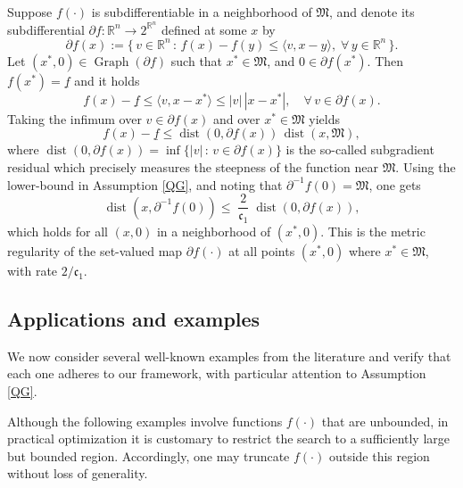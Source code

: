 \documentclass[12pt]{amsart}
\numberwithin{equation}{section}
\theoremstyle{plain}
\begin{document}
Suppose $f(\cdot)$ is subdifferentiable in a neighborhood of $\mathfrak{M}$, and denote its subdifferential $\partial f: \mathbb{R}^{n}\to 2^{\mathbb{R}^{n}}$ defined at some $x$ by
\begin{equation*}
    \partial f(x) :=\{\, v\in \mathbb{R}^{n}\, :\, f(x) - f(y) \leq \langle v, x-y \rangle,\; \forall\, y\in \mathbb{R}^{n} \,\}.
\end{equation*}
Let $(x^{*},0) \in \operatorname{Graph}(\partial f)$ such that $x^{*}\in \mathfrak{M}$, and $0\in \partial f(x^{*})$. Then $f(x^{*}) = \underline{f}$ and it holds
\begin{equation*}
    f(x) - \underline{f} \leq \langle v, x-x^{*} \rangle \leq |v| \,|x-x^{*}|, \quad \forall\, v\in \partial f(x).
\end{equation*}
Taking the infimum over $v\in \partial f(x)$ and over $x^{*}\in \mathfrak{M}$ yields
\begin{equation*}
    f(x) - \underline{f} \leq \operatorname{dist}(0,\partial f(x))\, \operatorname{dist}(x,\mathfrak{M}),
\end{equation*}
where $\operatorname{dist}(0,\partial f(x)) = \inf \{|v| \,:\, v\in \partial f(x)\}$ is the so-called subgradient residual which precisely measures the steepness of the function near $\mathfrak{M}$. Using the lower-bound in Assumption \ref{QG}, and noting that $\partial^{-1}f(0) = \mathfrak{M}$, one gets
\begin{equation*}
    \operatorname{dist}(x,\partial^{-1}f(0)) \leq \; \frac{2}{\mathfrak{c}_{1}} \; \operatorname{dist}(0,\partial f(x)),
\end{equation*}
which holds for all $(x,0)$ in a neighborhood of $(x^{*},0)$. This is the metric regularity of the set-valued map $\partial f(\cdot)$ at all points $(x^{*},0)$ where $x^{*}\in \mathfrak{M}$, with rate $2/\mathfrak{c}_{1}$.



\subsection{Applications and examples}
\label{sec: ex}

We now consider several well-known examples from the literature and verify that each one adheres to our framework, with particular attention to Assumption \ref{QG}.

Although the following examples involve functions $f(\cdot)$ that are unbounded, in practical optimization it is customary to restrict the search to a sufficiently large but bounded region. Accordingly, one may truncate $f(\cdot)$ outside this region without loss of generality.
\end{document}
